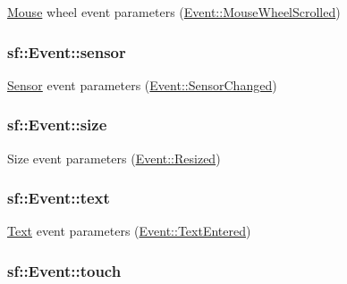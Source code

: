 \hyperlink{classsf_1_1_mouse}{Mouse} wheel event parameters (\hyperlink{classsf_1_1_event_af41fa9ed45c02449030699f671331d4aab9002e9cf83b792763b6dd8992c0b535}{Event\-::\-Mouse\-Wheel\-Scrolled}) 

\hypertarget{classsf_1_1_event_acdeacbb321655b962e27d08eeec5a190}{
\subsubsection[{sensor}]{ sf\-::\-Event\-::sensor}}\label{classsf_1_1_event_acdeacbb321655b962e27d08eeec5a190}


\hyperlink{classsf_1_1_sensor}{Sensor} event parameters (\hyperlink{classsf_1_1_event_af41fa9ed45c02449030699f671331d4aac175c7fb90d3b03cda554ada20d42795}{Event\-::\-Sensor\-Changed}) 

\hypertarget{classsf_1_1_event_a85dae56a377eeffd39183c3f6fc96cb9}{
\subsubsection[{size}]{ sf\-::\-Event\-::size}}\label{classsf_1_1_event_a85dae56a377eeffd39183c3f6fc96cb9}


Size event parameters (\hyperlink{classsf_1_1_event_af41fa9ed45c02449030699f671331d4aac5a9f3d76cbf4a577fa982623f3198eb}{Event\-::\-Resized}) 

\hypertarget{classsf_1_1_event_a00c7bba6bee892791847ec22440e0a83}{
\subsubsection[{text}]{ sf\-::\-Event\-::text}}\label{classsf_1_1_event_a00c7bba6bee892791847ec22440e0a83}


\hyperlink{classsf_1_1_text}{Text} event parameters (\hyperlink{classsf_1_1_event_af41fa9ed45c02449030699f671331d4aa4da4ae2f3e97f8cbd3cb725f2da21a10}{Event\-::\-Text\-Entered}) 

\hypertarget{classsf_1_1_event_a5f6ed8e499a4c3d171ff1baab469b2ee}{
\subsubsection[{touch}]{ sf\-::\-Event\-::touch}}\label{classsf_1_1_event_a5f6ed8e499a4c3d171ff1baab469b2ee}


